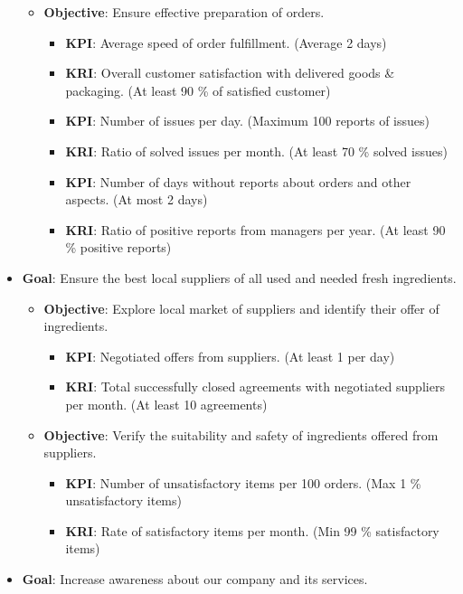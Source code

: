 \documentclass[11pt,a4paper]{article}
\begin{document}
\begin{itemize}
\begin{itemize}
        \item \textbf{Objective}: Ensure effective preparation of orders.
        \begin{itemize}
            \item \textbf{KPI}: Average speed of order fulfillment. (Average 2 days)
            \item \textbf{KRI}: Overall customer satisfaction with delivered goods \& packaging. (At least 90 \% of satisfied customer)
            \item \textbf{KPI}: Number of issues per day. (Maximum 100 reports of issues)
            \item \textbf{KRI}: Ratio of solved issues per month. (At least 70 \% solved issues)
            \item \textbf{KPI}: Number of days without reports about orders and other aspects. (At most 2 days)
            \item \textbf{KRI}: Ratio of positive reports from managers per year. (At least 90 \% positive reports)
        \end{itemize}
    \end{itemize}
    \item \textbf{Goal}: Ensure the best local suppliers of all used and needed fresh ingredients.
    \begin{itemize}
        \item \textbf{Objective}: Explore local market of suppliers and identify their offer of ingredients.
        \begin{itemize}
            \item \textbf{KPI}: Negotiated offers from suppliers. (At least 1 per day)
            \item \textbf{KRI}: Total successfully closed agreements with negotiated suppliers per month. (At least 10 agreements)
        \end{itemize}
        \item \textbf{Objective}: Verify the suitability and safety of ingredients offered from suppliers.
        \begin{itemize}
            \item \textbf{KPI}: Number of unsatisfactory items per 100 orders. (Max 1 \% unsatisfactory items)
            \item \textbf{KRI}: Rate of satisfactory items per month. (Min 99 \% satisfactory items)
        \end{itemize}
    \end{itemize}
    \item \textbf{Goal}: Increase awareness about our company and its services.

\end{itemize}
\end{document}
